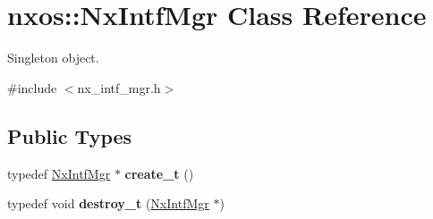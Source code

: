 \hypertarget{classnxos_1_1NxIntfMgr}{\section{nxos\-:\-:Nx\-Intf\-Mgr Class Reference}
\label{classnxos_1_1NxIntfMgr}
}


Singleton object.  




{\ttfamily \#include $<$nx\-\_\-intf\-\_\-mgr.\-h$>$}

\subsection*{Public Types}
\begin{DoxyCompactItemize}
\item 
\hypertarget{classnxos_1_1NxIntfMgr_a7e6921669392c06d78a34db4554bb7bc}{typedef \hyperlink{classnxos_1_1NxIntfMgr}{Nx\-Intf\-Mgr} $\ast$ {\bfseries create\-\_\-t} ()}\label{classnxos_1_1NxIntfMgr_a7e6921669392c06d78a34db4554bb7bc}

\item 
\hypertarget{classnxos_1_1NxIntfMgr_ac85b93641d1d96dc33509fd793fa5781}{typedef void {\bfseries destroy\-\_\-t} (\hyperlink{classnxos_1_1NxIntfMgr}{Nx\-Intf\-Mgr} $\ast$)}\label{classnxos_1_1NxIntfMgr_ac85b93641d1d96dc33509fd793fa5781}

\end{DoxyCompactItemize}
